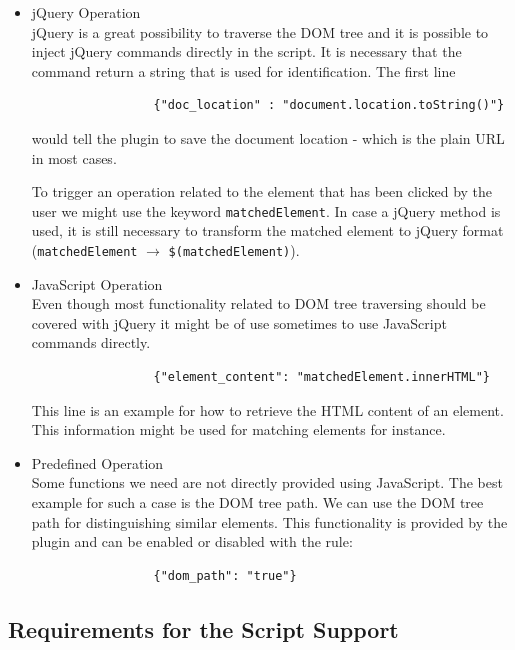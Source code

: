 \begin{itemize}
	\item jQuery Operation \\ 
	jQuery is a great possibility to traverse the DOM tree and it is possible to inject jQuery commands directly in the script. It is necessary that the command return a string that is used for identification. The first line
		\begin{lstlisting}
		         {"doc_location" : "document.location.toString()"}
		\end{lstlisting}
	would tell the plugin to save the document location - which is the plain URL in most cases. 
	
	To trigger an operation related to the element that has been clicked by the user we might use the keyword \verb^matchedElement^. In case a jQuery method is used, it is still necessary to transform the matched element to jQuery format (\verb^matchedElement^ $\rightarrow$ \verb^$(matchedElement)^). 
	
	\item	 JavaScript Operation \\
	Even though most functionality related to DOM tree traversing should be covered with jQuery it might be of use sometimes to use JavaScript commands directly. 
		\begin{lstlisting}
		         {"element_content": "matchedElement.innerHTML"}
		\end{lstlisting}
	This line is an example for how to retrieve the HTML content of an element. This information might be used for matching elements for instance. 
	
	\item Predefined Operation \label{predefined-operation}\\
	Some functions we need are not directly provided using JavaScript. The best example for such a case is the DOM tree path. We can use the DOM tree path for distinguishing similar elements. This functionality is provided by the plugin and can be enabled or disabled with the rule:
		\begin{lstlisting}
		         {"dom_path": "true"}
		\end{lstlisting}	
\end{itemize}

\subsection{Requirements for the Script Support}


